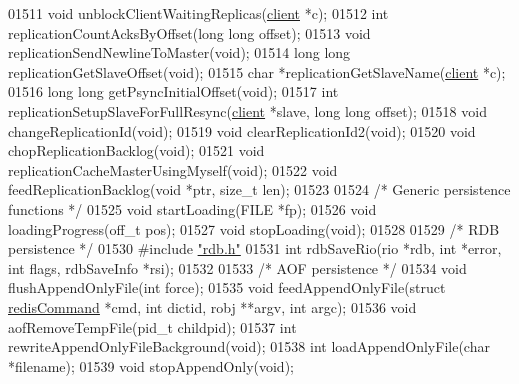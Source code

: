 \begin{DoxyCode}
{{{{{{{01511 \textcolor{keywordtype}{void} unblockClientWaitingReplicas(\hyperlink{structclient}{client} *c);
01512 \textcolor{keywordtype}{int} replicationCountAcksByOffset(\textcolor{keywordtype}{long} \textcolor{keywordtype}{long} offset);
01513 \textcolor{keywordtype}{void} replicationSendNewlineToMaster(\textcolor{keywordtype}{void});
01514 \textcolor{keywordtype}{long} \textcolor{keywordtype}{long} replicationGetSlaveOffset(\textcolor{keywordtype}{void});
01515 \textcolor{keywordtype}{char} *replicationGetSlaveName(\hyperlink{structclient}{client} *c);
01516 \textcolor{keywordtype}{long} \textcolor{keywordtype}{long} getPsyncInitialOffset(\textcolor{keywordtype}{void});
01517 \textcolor{keywordtype}{int} replicationSetupSlaveForFullResync(\hyperlink{structclient}{client} *slave, \textcolor{keywordtype}{long} \textcolor{keywordtype}{long} offset);
01518 \textcolor{keywordtype}{void} changeReplicationId(\textcolor{keywordtype}{void});
01519 \textcolor{keywordtype}{void} clearReplicationId2(\textcolor{keywordtype}{void});
01520 \textcolor{keywordtype}{void} chopReplicationBacklog(\textcolor{keywordtype}{void});
01521 \textcolor{keywordtype}{void} replicationCacheMasterUsingMyself(\textcolor{keywordtype}{void});
01522 \textcolor{keywordtype}{void} feedReplicationBacklog(\textcolor{keywordtype}{void} *ptr, size\_t len);
01523 
01524 \textcolor{comment}{/* Generic persistence functions */}
01525 \textcolor{keywordtype}{void} startLoading(FILE *fp);
01526 \textcolor{keywordtype}{void} loadingProgress(off\_t pos);
01527 \textcolor{keywordtype}{void} stopLoading(\textcolor{keywordtype}{void});
01528 
01529 \textcolor{comment}{/* RDB persistence */}
01530 \textcolor{preprocessor}{#}\textcolor{preprocessor}{include} \hyperlink{rdb_8h}{"rdb.h"}
01531 \textcolor{keywordtype}{int} rdbSaveRio(rio *rdb, \textcolor{keywordtype}{int} *error, \textcolor{keywordtype}{int} flags, rdbSaveInfo *rsi);
01532 
01533 \textcolor{comment}{/* AOF persistence */}
01534 \textcolor{keywordtype}{void} flushAppendOnlyFile(\textcolor{keywordtype}{int} force);
01535 \textcolor{keywordtype}{void} feedAppendOnlyFile(\textcolor{keyword}{struct} \hyperlink{structredisCommand}{redisCommand} *cmd, \textcolor{keywordtype}{int} dictid, robj **argv, \textcolor{keywordtype}{int} argc);
01536 \textcolor{keywordtype}{void} aofRemoveTempFile(pid\_t childpid);
01537 \textcolor{keywordtype}{int} rewriteAppendOnlyFileBackground(\textcolor{keywordtype}{void});
01538 \textcolor{keywordtype}{int} loadAppendOnlyFile(\textcolor{keywordtype}{char} *filename);
01539 \textcolor{keywordtype}{void} stopAppendOnly(\textcolor{keywordtype}{void});
}}}}}}}
\end{DoxyCode}
